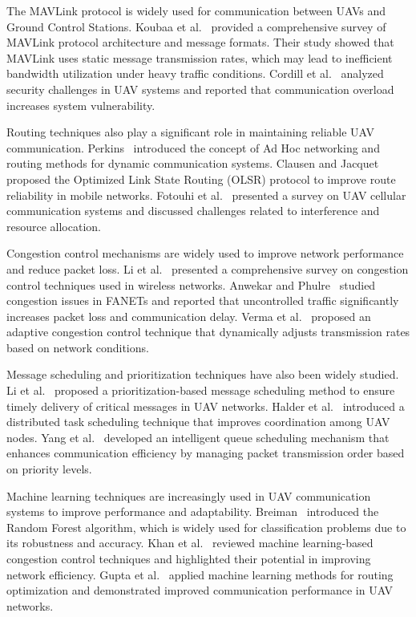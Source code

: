 The MAVLink protocol is widely used for communication between UAVs
and Ground Control Stations. Koubaa et al.~\cite{koubaa2019micro}
provided a comprehensive survey of MAVLink protocol architecture
and message formats. Their study showed that MAVLink uses static
message transmission rates, which may lead to inefficient bandwidth
utilization under heavy traffic conditions. Cordill et
al.~\cite{cordill2025comprehensive} analyzed security challenges
in UAV systems and reported that communication overload increases
system vulnerability.

Routing techniques also play a significant role in maintaining
reliable UAV communication. Perkins~\cite{perkins1999adhoc}
introduced the concept of Ad Hoc networking and routing methods
for dynamic communication systems. Clausen and
Jacquet~\cite{clausen2003olsr} proposed the Optimized Link State
Routing (OLSR) protocol to improve route reliability in mobile
networks. Fotouhi et al.~\cite{fotouhi2019survey} presented a
survey on UAV cellular communication systems and discussed
challenges related to interference and resource allocation.

Congestion control mechanisms are widely used to improve network
performance and reduce packet loss. Li et al.~\cite{li2020congestion}
presented a comprehensive survey on congestion control techniques
used in wireless networks. Anwekar and
Phulre~\cite{anwekar2023analysis} studied congestion issues in
FANETs and reported that uncontrolled traffic significantly
increases packet loss and communication delay. Verma et
al.~\cite{verma2024adaptive} proposed an adaptive congestion
control technique that dynamically adjusts transmission rates
based on network conditions.

Message scheduling and prioritization techniques have also been
widely studied. Li et al.~\cite{li2018prioritizing} proposed a
prioritization-based message scheduling method to ensure timely
delivery of critical messages in UAV networks. Halder et
al.~\cite{halder2022dynamic} introduced a distributed task
scheduling technique that improves coordination among UAV nodes.
Yang et al.~\cite{yang2025intelligent} developed an intelligent
queue scheduling mechanism that enhances communication efficiency
by managing packet transmission order based on priority levels.

Machine learning techniques are increasingly used in UAV
communication systems to improve performance and adaptability.
Breiman~\cite{breiman2001randomforest} introduced the Random
Forest algorithm, which is widely used for classification
problems due to its robustness and accuracy. Khan et
al.~\cite{khan2020mlnetwork} reviewed machine learning-based
congestion control techniques and highlighted their potential
in improving network efficiency. Gupta et
al.~\cite{gupta2021mlrouting} applied machine learning methods
for routing optimization and demonstrated improved communication
performance in UAV networks.

